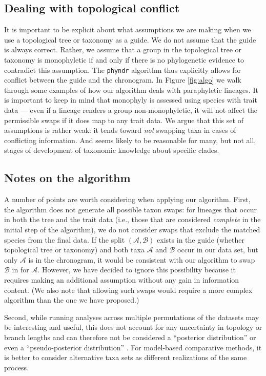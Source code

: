 \documentclass[a4paper,11pt]{article}
\newcommand{\phyndr}{\tt phyndr}
\begin{document}
\subsection{Dealing with topological conflict}

It is important to be explicit about what assumptions we are making when we use a topological tree or taxonomy as a guide. We do not assume that the guide is always correct. Rather, we assume that a group in the topological tree or taxonomy is monophyletic if and only if there is no phylogenetic evidence to contradict this assumption. The {\phyndr} algorithm thus explicitly allows for conflict between the guide and the chronogram. In Figure \ref{fig:algo} we walk through some examples of how our algorithm deals with paraphyletic lineages. It is important to keep in mind that monophyly is assessed using species with trait data --- even if a lineage renders a group non-monophyletic, it will not affect the permissible swaps if it does map to any trait data. We argue that this set of assumptions is rather weak: it tends toward \emph{not} swapping taxa in cases of conflicting information. And seems likely to be reasonable for many, but not all, stages of development of taxonomic knowledge about specific clades.  

\subsection{Notes on the algorithm}

A number of points are worth considering when applying our algorithm. First, the algorithm does not generate all possible taxon swaps: for lineages that occur in both the tree and the trait data (i.e., those that are considered \emph{complete} in the initial step of the algorithm), we do not consider swaps that exclude the matched species from the final data. If the split $(\mathcal{A,B})$ exists in the guide (whether topological tree or taxonomy) and both taxa $\mathcal{A}$ and $\mathcal{B}$ occur in our data set, but only $\mathcal{A}$ is in the chronogram, it would be consistent with our algorithm to swap $\mathcal{B}$ in for $\mathcal{A}$. However, we have decided to ignore this possibility because it requires making an additional assumption without any gain in information content. (We also note that allowing such swaps would require a more complex algorithm than the one we have proposed.) 

Second, while running analyses across multiple permutations of the datasets may be interesting and useful, this does not account for any uncertainty in topology or branch lengths and can therefore not be considered a ``posterior distribution'' or even a ``pseudo-posterior distribution'' \citep[\emph{sensu}][]{ThomasPastis, Rabosky2015}. For model-based comparative methods, it is better to consider alternative taxa sets as different realizations of the same process. 
\end{document}
